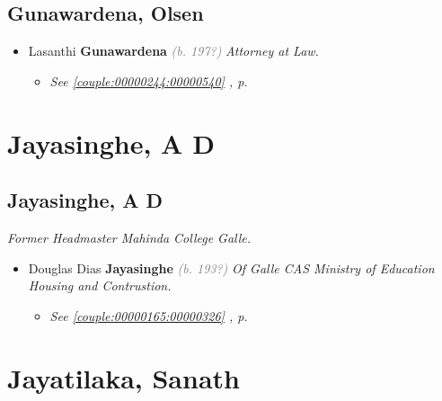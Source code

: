 \documentclass[10pt, openany]{book}
\begin{document}
\chapter{Gunawardena, Olsen}
\label{00000247}
\textcolor{slmaroon}{\textit{}}
\begin{itemize}
\item{Lasanthi \textbf{Gunawardena} \textcolor{gray}{\textit{(b. 197?)}} \textcolor{slmaroon}{\textit{Attorney at Law.}}
\begin{itemize}
\item{\textcolor{slteal}{\textit{See  \autoref{couple:00000244:00000540} \textit{, p. \pageref{couple:00000244:00000540} }}}}
\end{itemize}
 }
\end{itemize}
 
\part{Jayasinghe, A D}
\chapter{Jayasinghe, A D}
\label{00000323}
\textcolor{slmaroon}{\textit{Former Headmaster Mahinda College Galle.}}
\begin{itemize}
\item{Douglas Dias \textbf{Jayasinghe} \textcolor{gray}{\textit{(b. 193?)}} \textcolor{slmaroon}{\textit{Of Galle CAS Ministry of Education Housing and Contrustion.}}
\begin{itemize}
\item{\textcolor{slteal}{\textit{See  \autoref{couple:00000165:00000326} \textit{, p. \pageref{couple:00000165:00000326} }}}}
\end{itemize}
  }
\end{itemize}
  
\part{Jayatilaka, Sanath}
\end{document}
